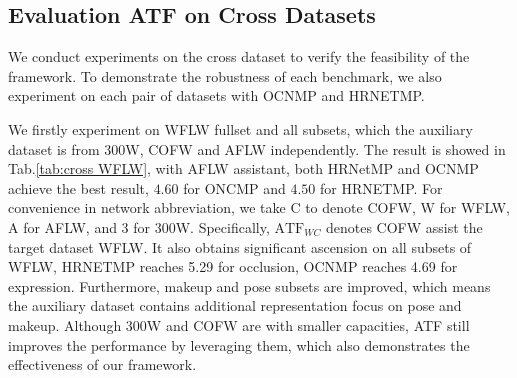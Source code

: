 \documentclass[journal,transmag]{IEEEtran}
\begin{document}
\begin{table}[t]
\begin{center}
\end{center}
\caption{Comparison in NME of networks on 300W benchmark (fullset, common subset and challenge subset). }
\label{tab:cross 300W}
\end{table}



\subsection{Evaluation ATF on Cross Datasets}
We conduct experiments on the cross dataset to verify the feasibility of the framework.
To demonstrate the robustness of each benchmark, we also experiment on each pair of datasets with OCNMP and HRNETMP.

We firstly experiment on WFLW fullset and all subsets, which the auxiliary dataset is from 300W, COFW and AFLW independently.
The result is showed in Tab.\ref{tab:cross WFLW}, with AFLW assistant, both HRNetMP and OCNMP achieve the best result, $4.60$ for ONCMP and $4.50$ for HRNETMP.
For convenience in network abbreviation, we take C to denote COFW, W for WFLW, A for AFLW, and 3 for 300W. Specifically, $\text{ATF}_{WC}$ denotes COFW assist the target dataset WFLW.
It also obtains significant ascension on all subsets of WFLW, HRNETMP reaches 5.29 for occlusion, OCNMP reaches 4.69 for expression.
Furthermore, makeup and pose subsets are improved, which means the auxiliary dataset contains additional representation focus on pose and makeup.
Although 300W and COFW are with smaller capacities, ATF still improves the performance by leveraging them, which also demonstrates the effectiveness of our framework.
\end{document}
